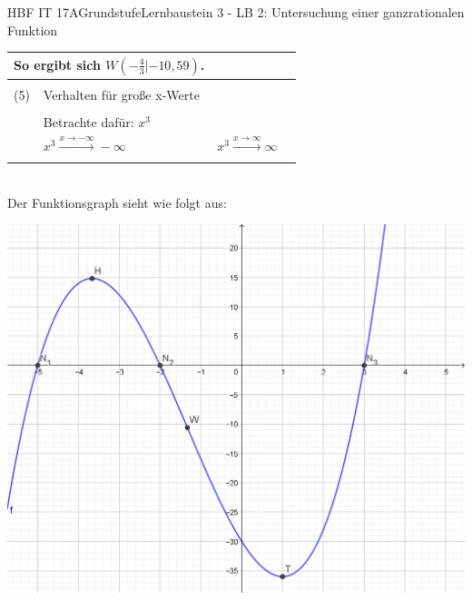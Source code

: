 \documentclass[oneside,openany,headings=optiontotoc,11pt,numbers=noenddot]{scrreprt}
\begin{document}
\begin{worksheet}{HBF IT 17A}{Grundstufe}{Lernbaustein 3 - LB 2: Untersuchung einer ganzrationalen Funktion}
\begin{framed}
\begin{tabularx}{\textwidth}{lXXl}
				\multicolumn{2}{l}{So ergibt sich \colorbox{blue!5}{\(W(-\frac{4}{3}|-10,59)\)}.}\\
				\hline\hline\\
				(5) & Verhalten für große x-Werte\\
				\hline\\
				& Betrachte dafür: \(x^3\)\\
				& \colorbox{green!10}{\(x^3\xrightarrow{x\rightarrow-\infty}-\infty\)} & \colorbox{green!10}{\(x^3\xrightarrow{x\rightarrow\infty}\infty\)}\\
				\hline\hline\\
			\end{tabularx}\\
			\newpage
			Der Funktionsgraph sieht wie folgt aus:\\
			\par
			\includegraphics[scale=0.4]{Bilder/HAd.png}
		\end{framed}
	\end{worksheet}
\end{document}
